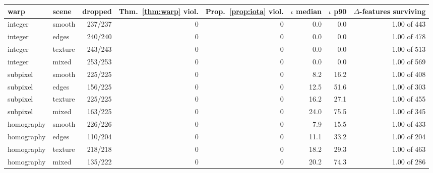 \begin{tabular}{llrrrrrr}
\toprule
warp & scene & dropped & Thm.~\ref{thm:warp} viol. & Prop.~\ref{prop:iota} viol. & $\iota$ median & $\iota$ p90 & $\Delta$-features surviving \\
\midrule
integer & smooth & 237/237 & 0 & 0 & 0.0 & 0.0 & 1.00 of 443 \\
integer & edges & 240/240 & 0 & 0 & 0.0 & 0.0 & 1.00 of 478 \\
integer & texture & 243/243 & 0 & 0 & 0.0 & 0.0 & 1.00 of 513 \\
integer & mixed & 253/253 & 0 & 0 & 0.0 & 0.0 & 1.00 of 569 \\
subpixel & smooth & 225/225 & 0 & 0 & 8.2 & 16.2 & 1.00 of 408 \\
subpixel & edges & 156/225 & 0 & 0 & 12.5 & 51.6 & 1.00 of 303 \\
subpixel & texture & 225/225 & 0 & 0 & 16.2 & 27.1 & 1.00 of 455 \\
subpixel & mixed & 163/225 & 0 & 0 & 24.0 & 75.5 & 1.00 of 345 \\
homography & smooth & 226/226 & 0 & 0 & 7.9 & 15.5 & 1.00 of 433 \\
homography & edges & 110/204 & 0 & 0 & 11.1 & 33.2 & 1.00 of 204 \\
homography & texture & 218/218 & 0 & 0 & 18.2 & 29.3 & 1.00 of 463 \\
homography & mixed & 135/222 & 0 & 0 & 20.2 & 74.3 & 1.00 of 286 \\
\bottomrule
\end{tabular}
